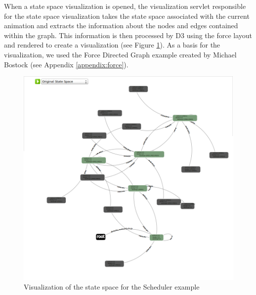 When a state space visualization is opened, the visualization servlet responsible for the state space visualization takes the state space associated with the current animation and extracts the information about the nodes and edges contained within the graph. This information is then processed by D3 using the force layout and rendered to create a visualization (see Figure \ref{zoomedOut}). As a basis for the visualization, we used the Force Directed Graph example created by Michael Bostock (see Appendix \ref{appendix:force}). 

\begin{figure}[h!]
\centering
\includegraphics[width=14cm]{bilder/ss-zoomedOut.png}
\caption{Visualization of the state space for the Scheduler example}
\label{zoomedOut}
\end{figure}


